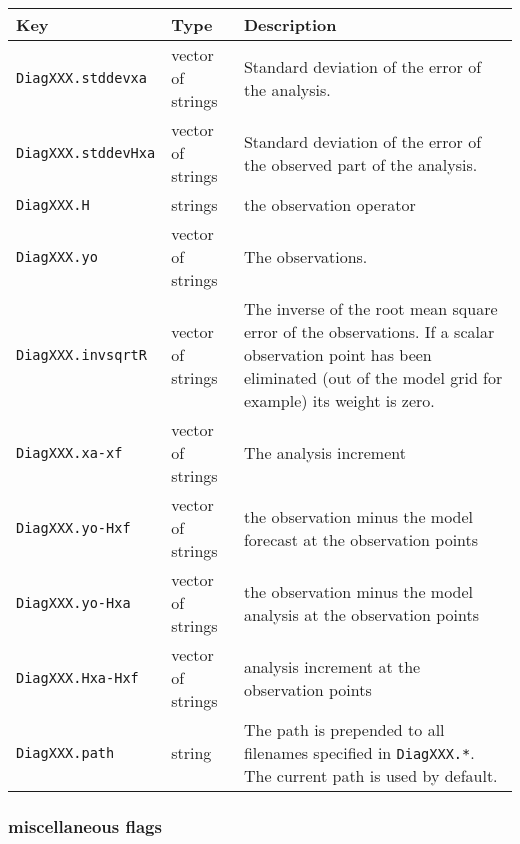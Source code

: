 \documentclass[a4paper,12pt]{article}
\newcommand{\code}{\texttt}
\newenvironment{keytabular}{\begin{tabular}{|p{0.3\textwidth}|p{0.2\textwidth}|p{0.5\textwidth}|} \hline Key & Type & Description \\ \hline \hline }{\end{tabular}}
\begin{document}
\begin{keytabular}
\code{DiagXXX.stddevxa} & vector of strings & Standard deviation of
the error of the analysis.
\\
\code{DiagXXX.stddevHxa} & vector of strings & Standard deviation of
the error of the observed part of the analysis.
\\
\hline
\code{DiagXXX.H} & strings & the observation operator
\\
\code{DiagXXX.yo} & vector of strings & The observations.
\\
\code{DiagXXX.invsqrtR} & vector of strings & The inverse of the root mean
square error of the observations. If a scalar observation point has
been eliminated (out of the model grid for example) its weight is zero.
\\
\code{DiagXXX.xa-xf} & vector of strings & The analysis increment
\\
\code{DiagXXX.yo-Hxf} & vector of strings & the observation minus the
model forecast at the observation points
\\
\code{DiagXXX.yo-Hxa} & vector of strings & the observation minus the
model analysis at the observation points
\\
\code{DiagXXX.Hxa-Hxf} & vector of strings & analysis increment 
at the observation points
\\
\code{DiagXXX.path} & string & The path is prepended to all filenames
specified in \code{DiagXXX.*}. The current path is used by default.
\\
\hline
\end{keytabular}

\subsubsection{miscellaneous flags}
\end{document}
